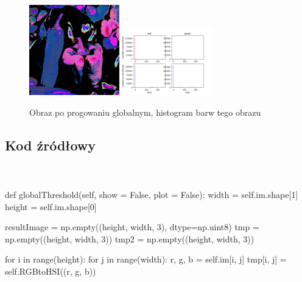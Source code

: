 \documentclass[final,a4paper,openany,12pt]{mwbk}
\begin{document}
\begin{figure}[H]
	\begin{center}
		\includegraphics[width=0.35\textwidth]{peppers_color_globThreshold_result}
		\includegraphics[width=0.35\textwidth]{peppers_color_globThreshold_histogram}
	\end{center}
	\caption{Obraz po progowaniu globalnym, histogram barw tego obrazu}
\end{figure}

\subsection*{Kod źródłowy}
\hfill
\\\\
\noindent def globalThreshold(self, show = False, plot = False): \newline
\indent width = self.im.shape[1] \newline
\indent height = self.im.shape[0] \newline

resultImage = np.empty((height, width, 3), dtype=np.uint8) \newline
\indent tmp = np.empty((height, width, 3)) \newline
\indent tmp2 = np.empty((height, width, 3)) \newline


\indent for i in range(height): \newline
\indent for j in range(width): \newline
\indent r, g, b = self.im[i, j] \newline
\indent tmp[i, j] = self.RGBtoHSI((r, g, b)) \newline
\end{document}
